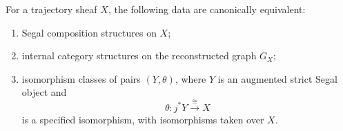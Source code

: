 \begin{theorem}
\label{thm:classification-segal-enhancements}
For a trajectory sheaf \(X\), the following data are canonically equivalent:
\begin{enumerate}
    \item Segal composition structures on \(X\);
    \item internal category structures on the reconstructed graph \(G_X\);
    \item isomorphism classes of pairs \((Y,\theta)\), where \(Y\) is an
    augmented strict Segal object and
    \[
        \theta:j^\ast Y\xrightarrow{\cong}X
    \]
    is a specified isomorphism, with isomorphisms taken over \(X\).
\end{enumerate}
\end{theorem}

